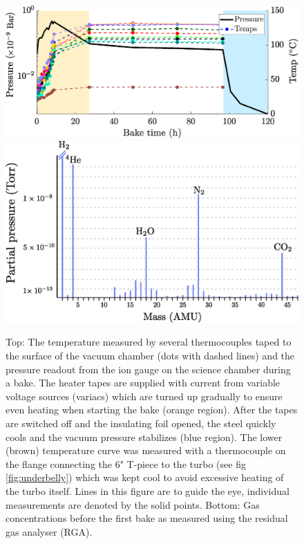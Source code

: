 	\begin{figure}
		\includegraphics[width=\textwidth]{fig/lattice/bake_record.eps}
		\includegraphics[width=\textwidth]{fig/lattice/RGA_pre_bake_nice}
		\caption{Top: The temperature measured by several thermocouples taped to the surface of the vacuum chamber (dots with dashed lines) and the pressure readout from the ion gauge on the science chamber during a bake.
		The heater tapes are supplied with current from variable voltage sources (variacs) which are turned up gradually to ensure even heating when starting the bake (orange region).
		After the tapes are switched off and the insulating foil opened, the steel quickly cools and the vacuum pressure stabilizes (blue region).
		The lower (brown) temperature curve was measured with a thermocouple on the flange connecting the 6" T-piece to the turbo (see fig \ref{fig:underbelly}) which was kept cool to avoid excessive heating of the turbo itself. 
		Lines in this figure are to guide the eye, individual measurements are denoted by the solid points.
		Bottom:
		Gas concentrations before the first bake as measured using the residual gas analyser (RGA). 
		}
		\label{fig:bakeouts}
		\end{figure}
			
